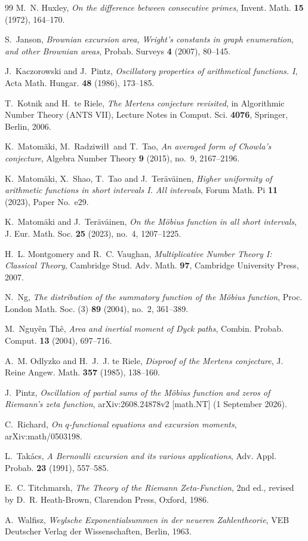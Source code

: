 \documentclass[11pt]{amsart}
\numberwithin{equation}{section}
\theoremstyle{plain}
\theoremstyle{definition}
\theoremstyle{remark}
\begin{document}
\begin{thebibliography}{99}
M.~N. Huxley, \emph{On the difference between consecutive primes}, Invent.
Math. \textbf{15} (1972), 164--170.

S.~Janson, \emph{Brownian excursion area, Wright's constants in graph
enumeration, and other Brownian areas}, Probab. Surveys \textbf{4} (2007),
80--145.

J.~Kaczorowski and J.~Pintz, \emph{Oscillatory properties of arithmetical
functions. I}, Acta Math. Hungar. \textbf{48} (1986), 173--185.

T.~Kotnik and H.~te Riele, \emph{The Mertens conjecture revisited}, in
Algorithmic Number Theory (ANTS VII), Lecture Notes in Comput. Sci.
\textbf{4076}, Springer, Berlin, 2006.

K.~Matom\"aki, M.~Radziwi\l\l\ and T.~Tao, \emph{An averaged form of Chowla's
conjecture}, Algebra Number Theory \textbf{9} (2015), no.~9, 2167--2196.

K.~Matom\"aki, X.~Shao, T.~Tao and J.~Ter\"av\"ainen, \emph{Higher uniformity
of arithmetic functions in short intervals I. All intervals}, Forum Math.
Pi \textbf{11} (2023), Paper No.~e29.

K.~Matom\"aki and J.~Ter\"av\"ainen, \emph{On the M\"obius function in all
short intervals}, J. Eur. Math. Soc. \textbf{25} (2023), no.~4, 1207--1225.

H.~L. Montgomery and R.~C. Vaughan, \emph{Multiplicative Number Theory I:
Classical Theory}, Cambridge Stud. Adv. Math. \textbf{97}, Cambridge
University Press, 2007.

N.~Ng, \emph{The distribution of the summatory function of the M\"obius
function}, Proc. London Math. Soc. (3) \textbf{89} (2004), no.~2, 361--389.

M.~Nguy\^en Th\^e, \emph{Area and inertial moment of Dyck paths}, Combin.
Probab. Comput. \textbf{13} (2004), 697--716.

A.~M. Odlyzko and H.~J.~J. te Riele, \emph{Disproof of the Mertens
conjecture}, J. Reine Angew. Math. \textbf{357} (1985), 138--160.

J.~Pintz, \emph{Oscillation of partial sums of the M\"obius function and
zeros of Riemann's zeta function}, arXiv:2608.24878v2 [math.NT] (1 September 2026).

C.~Richard, \emph{On $q$-functional equations and excursion moments},
arXiv:math/0503198.

L.~Tak\'acs, \emph{A Bernoulli excursion and its various applications},
Adv. Appl. Probab. \textbf{23} (1991), 557--585.

E.~C. Titchmarsh, \emph{The Theory of the Riemann Zeta-Function}, 2nd ed.,
revised by D.~R. Heath-Brown, Clarendon Press, Oxford, 1986.

A.~Walfisz, \emph{Weylsche Exponentialsummen in der neueren Zahlentheorie},
VEB Deutscher Verlag der Wissenschaften, Berlin, 1963.

\end{thebibliography}
\end{document}
